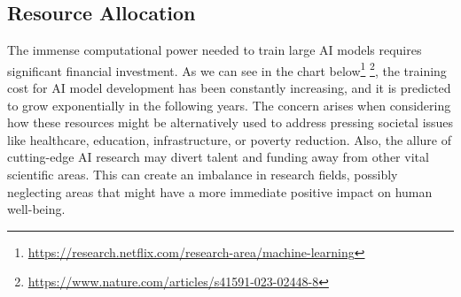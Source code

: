 \documentclass[
]{book}
\begin{document}
\hypertarget{resource-allocation}{%
\subsection{Resource Allocation}\label{resource-allocation}}

The immense computational power needed to train large AI models requires significant financial investment. As we can see in the chart below\footnote{\url{https://research.netflix.com/research-area/machine-learning}} \footnote{\url{https://www.nature.com/articles/s41591-023-02448-8}}, the training cost for AI model development has been constantly increasing, and it is predicted to grow exponentially in the following years. The concern arises when considering how these resources might be alternatively used to address pressing societal issues like healthcare, education, infrastructure, or poverty reduction. Also, the allure of cutting-edge AI research may divert talent and funding away from other vital scientific areas. This can create an imbalance in research fields, possibly neglecting areas that might have a more immediate positive impact on human well-being.
\end{document}
